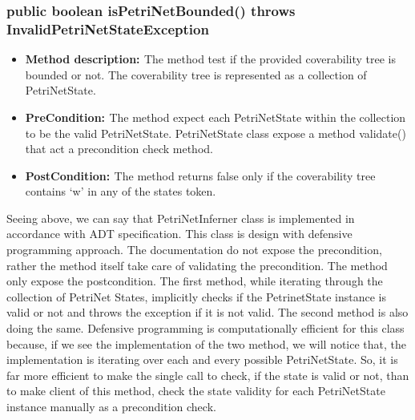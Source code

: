 \subsubsection*{\bf{public boolean isPetriNetBounded() throws InvalidPetriNetStateException}}
\begin{itemize}[label={},leftmargin=2em]


\item {\bf{Method description: }}  The method test if the provided coverability tree is bounded or not. The coverability tree is represented as a collection of PetriNetState.



\item {\bf{PreCondition: }} The method expect  each PetriNetState  within the collection to be the valid PetriNetState. PetriNetState class expose a method validate() that act a precondition check method.



\item {\bf{PostCondition: }} The method returns false only if the coverability tree contains ‘w’ in any of the states token.

\end{itemize}


Seeing above, we can say that PetriNetInferner class is implemented in accordance with ADT specification. This class is design with defensive programming approach. The documentation do not expose the precondition, rather the method itself  take care of validating the precondition. The method only expose the postcondition. The first method, while iterating through the collection of PetriNet States, implicitly checks if the PetrinetState instance is valid or not and throws the exception if it is not valid. The second method is also doing the same. Defensive programming is computationally efficient for this class because, if we see the implementation of the two method, we will notice that, the implementation is  iterating over  each and every possible PetriNetState. So, it is far more efficient to make the single call to check, if the state is valid or not, than to make  client of this method, check the state validity for each PetriNetState instance manually as a precondition check.


